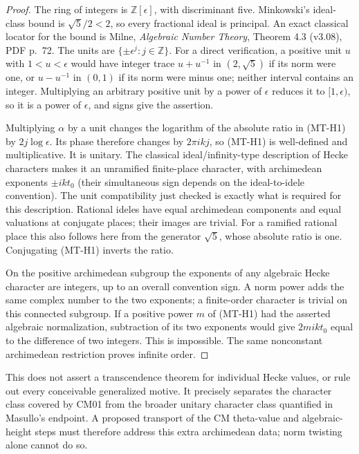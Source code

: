\begin{proof}
The ring of integers is $\mathbb Z[\epsilon]$, with discriminant five.
Minkowski's ideal-class bound is $\sqrt5/2<2$, so every fractional
ideal is principal. An exact classical locator for the bound is
Milne, \emph{Algebraic Number Theory}, Theorem 4.3 (v3.08), PDF p.~72.
The units are $\{\pm\epsilon^j:j\in\mathbb Z\}$. For a direct
verification, a positive unit $u$ with $1<u<\epsilon$ would have
integer trace $u+u^{-1}$ in $(2,\sqrt5)$ if its norm were one, or
$u-u^{-1}$ in $(0,1)$ if its norm were minus one; neither interval
contains an integer. Multiplying an arbitrary positive unit by a
power of $\epsilon$ reduces it to $[1,\epsilon)$, so it is a power
of $\epsilon$, and signs give the assertion.

Multiplying $\alpha$ by a unit changes the logarithm of the absolute
ratio in (MT-H1) by $2j\log\epsilon$. Its phase therefore changes by
$2\pi i k j$, so (MT-H1) is well-defined and multiplicative. It is
unitary. The classical ideal/infinity-type description of Hecke
characters makes it an unramified finite-place character, with
archimedean exponents $\pm ikt_0$ (their simultaneous sign depends
on the ideal-to-idele convention). The unit compatibility just checked
is exactly what is required for this description. Rational ideles
have equal archimedean components and equal valuations at conjugate
places; their images are trivial. For a ramified rational place this
also follows here from the generator $\sqrt5$, whose absolute ratio
is one. Conjugating (MT-H1) inverts the ratio.

On the positive archimedean subgroup the exponents of any algebraic
Hecke character are integers, up to an overall convention sign.
A norm power adds the same complex number to the two exponents;
a finite-order character is trivial on this connected subgroup.
If a positive power $m$ of (MT-H1) had the asserted algebraic
normalization, subtraction of its two exponents would give
$2mikt_0$ equal to the difference of two integers. This is impossible.
The same nonconstant archimedean restriction proves infinite order.
\end{proof}

This does not assert a transcendence theorem for individual Hecke
values, or rule out every conceivable generalized motive. It precisely
separates the character class covered by CM01 from the broader unitary
character class quantified in Masullo's endpoint. A proposed transport
of the CM theta-value and algebraic-height steps must therefore address
this extra archimedean data; norm twisting alone cannot do so.

